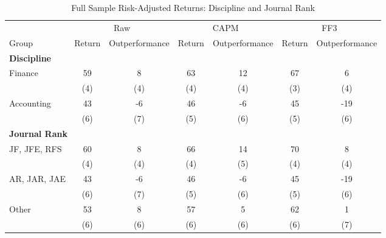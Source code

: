 \begin{table}[htbp]
\centering
\small
\caption{Full Sample Risk-Adjusted Returns: Discipline and Journal Rank}
\label{tab:risk_adjusted_fs_dj}
\setlength{\tabcolsep}{0.2ex}
\begin{tabular}{lcccccc}
\toprule
  & \multicolumn{2}{c}{Raw} & \multicolumn{2}{c}{CAPM} & \multicolumn{2}{c}{FF3}
\\
\cmidrule(lr){2-3} \cmidrule(lr){4-5} \cmidrule(lr){6-7}
Group & Return & Outperformance & Return & Outperformance & Return & Outperformance
\\
\midrule
\multicolumn{7}{l}{\textbf{Discipline}}\\
\addlinespace[2pt]
Finance & 59 & 8 & 63 & 12 & 67 & 6
\\
 & (4) & (4) & (4) & (4) & (3) & (4)
\\[2pt]
Accounting & 43 & -6 & 46 & -6 & 45 & -19
\\
 & (6) & (7) & (5) & (6) & (5) & (6)
\\[2pt]
\multicolumn{7}{l}{\textbf{Journal Rank}}\\
\addlinespace[2pt]
JF, JFE, RFS & 60 & 8 & 66 & 14 & 70 & 8
\\
 & (4) & (4) & (4) & (5) & (4) & (4)
\\[2pt]
AR, JAR, JAE & 43 & -6 & 46 & -6 & 45 & -19
\\
 & (6) & (7) & (5) & (6) & (5) & (6)
\\[2pt]
Other & 53 & 8 & 57 & 5 & 62 & 1
\\
 & (6) & (6) & (6) & (6) & (6) & (7)
\\[2pt]
\bottomrule
\end{tabular}
\end{table}
